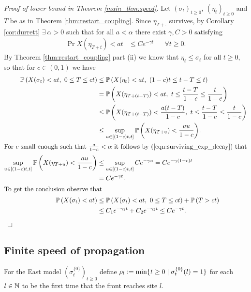 \begin{proof}[Proof of lower bound in Theorem \ref{main_thm:speed}]
Let $(\sigma_t)_{t \geq 0},\ (\eta_t)_{t \geq 0}$ and $T$ be as in Theorem \ref{thm:restart_coupling}. Since $\eta_{T + .}$ survives, by Corollary \ref{cor:durrett} $\exists\ \alpha > 0$ such that for all $a < \alpha$ there exist $\gamma, C > 0$ satisfying 
\begin{align}\label{eqn:surviving_exp_decay}
  \Pr{X(\eta_{T+t}) < at} &\leq C e^{- \gamma t}  &&\forall t \geq 0. 
\end{align}
By Theorem \ref{thm:restart_coupling} part (ii) we know that $\eta_t \leq \sigma_t$ for all $t \geq 0$, so that for $c \in (0,1)$ we have
\begin{align*}
  \Pr{X(\sigma_t) < at,\ 0 \leq T \leq ct} &\leq \Pr{X(\eta_t) < at,\ (1-c)t \leq t-T \leq t} \\
                                           &=    \Pr{X(\eta_{T + (t - T)}) < at,\ t \leq \frac{t-T}{1-c} \leq \frac{t}{1-c}} \\
                                           &\leq \Pr{X(\eta_{T + (t - T)}) < \frac{a(t - T)}{1-c},\ t \leq \frac{t-T}{1-c} \leq \frac{t}{1-c}} \\
                                           &\leq \sup\limits_{u \in [(1-c)t,t]} \Pr{X(\eta_{T + u}) < \frac{au}{1-c}}. \\
  \intertext{For $c$ small enough such that $\frac{a}{1-c} < \alpha$ it follows by (\ref{eqn:surviving_exp_decay}) that}
  \sup\limits_{u \in [(1-c)t,t]} \Pr{X(\eta_{T + u}) < \frac{au}{1-c}} &\leq \sup\limits_{u \in [(1-c)t,t]} C e^{-\gamma u}  = C e^{-\gamma (1-c) t} \\
                                                                       &= C e^{-\gamma t}. \\ 
  \intertext{To get the conclusion observe that}
    \Pr{X(\sigma_t) < at}  &\leq \Pr{X(\sigma_t) < at,\ 0 \leq T \leq ct} + \Pr{T > ct} \\
                           &\leq C_1 e^{-\gamma_1 t} + C_2 e^{-\gamma_2 t} \leq C e^{-\gamma t}. 
\end{align*}
\end{proof}

\subsection{Finite speed of propagation}

\begin{definition}\label{def:hitting_times}
For the East model $(\sigma^{\{0\}}_t)_{t \geq 0}$ define $\rho_l \defeq \min\{ t \geq 0 \mid \sigma^{\{0\}}_t(l) = 1\}$ for each $l \in \N$ to be the first time that the front reaches site $l$. 
\end{definition}

